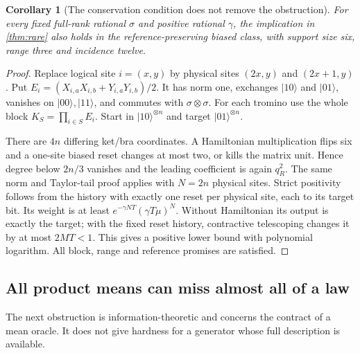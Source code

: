 \documentclass[11pt,reqno]{amsart}
\numberwithin{equation}{section}
\newtheorem{corollary}[theorem]{Corollary}
\theoremstyle{definition}
\theoremstyle{remark}
\newcommand{\ket}[1]{\lvert#1\rangle}
\begin{document}
\begin{corollary}[The conservation condition does not remove the obstruction]\label{cor:dualrail}
For every fixed full-rank rational $\sigma$ and positive rational $\gamma$, the implication in \cref{thm:rare} also holds in the reference-preserving biased class, with support size six, range three and incidence twelve.
\end{corollary}
\begin{proof}
Replace logical site $i=(x,y)$ by physical sites $(2x,y)$ and $(2x+1,y)$. Put
$E_i=(X_{i,a}X_{i,b}+Y_{i,a}Y_{i,b})/2$.
It has norm one, exchanges $\ket{10}$ and $\ket{01}$, vanishes on $\ket{00},\ket{11}$, and commutes with $\sigma\otimes\sigma$. For each tromino use the whole block $K_S=\prod_{i\in S}E_i$. Start in $\ket{10}^{\otimes n}$ and target $\ket{01}^{\otimes n}$.

There are $4n$ differing ket/bra coordinates. A Hamiltonian multiplication flips six and a one-site biased reset changes at most two, or kills the matrix unit. Hence degree below $2n/3$ vanishes and the leading coefficient is again $q_R^2$. The same norm and Taylor-tail proof applies with $N=2n$ physical sites. Strict positivity follows from the history with exactly one reset per physical site, each to its target bit. Its weight is at least $e^{-\gamma NT}(\gamma T\mu)^N$. Without Hamiltonian its output is exactly the target; with the fixed reset history, contractive telescoping changes it by at most $2MT<1$. This gives a positive lower bound with polynomial logarithm. All block, range and reference promises are satisfied.
\end{proof}

\subsection{All product means can miss almost all of a law}
The next obstruction is information-theoretic and concerns the contract of a mean oracle. It does not give hardness for a generator whose full description is available.
\end{document}
